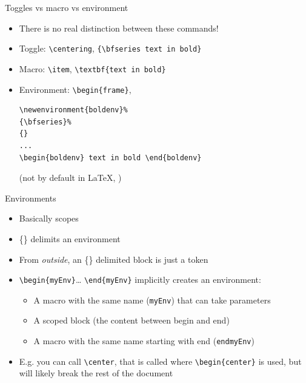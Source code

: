 \documentclass[english]{beamer}
\let\olditem\item
\renewcommand{\item}{\setlength{\itemsep}{\fill}\olditem}
\newenvironment{sitemize}{\let\item\olditem \begin{itemize}}{\vfill\end{itemize}}
\let\textttt\texttt
\renewcommand{\texttt}[1]{\colorbox{gray!10}{\textttt{#1}}}
\begin{document}
\begin{frame}[fragile]{Toggles vs macro vs environment}
    \begin{itemize}
        \item There is no real distinction between these commands! 
        \item Toggle: \verb|\centering|, \verb|{\bfseries text in bold}|
        \item Macro: \verb|\item|, \verb|\textbf{text in bold}|
        \item Environment: \verb|\begin{frame}|,
        \begin{verbatim}
\newenvironment{boldenv}%
{\bfseries}%
{}
...
\begin{boldenv} text in bold \end{boldenv}
        \end{verbatim} 
        
        
        (not by default in \LaTeX{}, \hyperlink{sld_macros}{})
    \end{itemize}
\end{frame}

\begin{frame}[fragile]{Environments}
    \begin{itemize}
        \item Basically scopes
        \item \{\} delimits an environment
        \item From \textit{outside}, an \{\} delimited block is just a token
        \item \verb|\begin{myEnv}|\dots{} \verb|\end{myEnv}| implicitly creates an environment:
        \begin{sitemize}
            \item A macro with the same name (\texttt{myEnv}) that can take parameters
            \item A scoped block (the content between begin and end)
            \item A macro with the same name starting with end (\texttt{endmyEnv})
        \end{sitemize}
        \item E.g. you can call \verb|\center|, that is called where \verb|\begin{center}| is used, but will likely break the rest of the document
    \end{itemize}
\end{frame}
\end{document}
